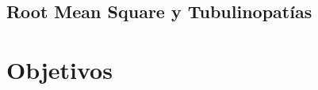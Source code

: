 \documentclass[11pt]{article}
\begin{document}
\subsection{Root Mean Square y Tubulinopatías}

\clearpage

\section{Objetivos}
\end{document}
